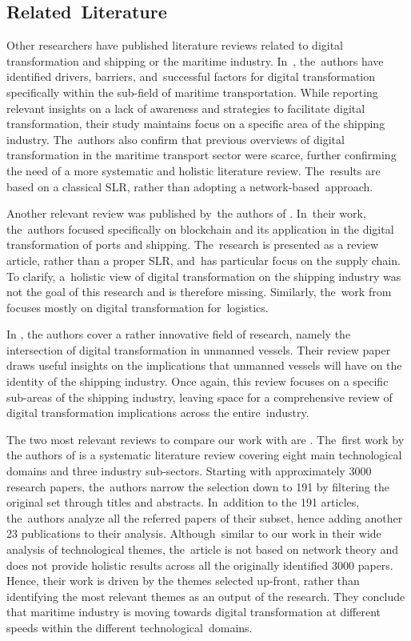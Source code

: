 \documentclass[jmse,review,accept,pdftex,moreauthors]{Definitions/mdpi}
\begin{document}
\subsection{Related~Literature}
Other researchers have published literature reviews related to digital transformation and shipping or the maritime industry. In~\citep{tijan2021digital}, the~authors have identified drivers, barriers, and~successful factors for digital transformation specifically within the sub-field of maritime transportation. While reporting relevant insights on a lack of awareness and strategies to facilitate digital transformation, their study maintains focus on a specific area of the shipping industry. The~authors also confirm that previous overviews of digital transformation in the maritime transport sector were scarce, further confirming the need of a more systematic and holistic literature review. The~results are based on a classical SLR, rather than adopting a network-based~approach.

Another relevant review was published by~the authors of \cite{alahmadi2022comparative}. In~their work, the~authors focused specifically on blockchain and its application in the digital transformation of ports and shipping. The~research is presented as a review article, rather than a proper SLR, and~has particular focus on the supply chain. To clarify, a~holistic view of digital transformation on the shipping industry was not the goal of this research and is therefore missing. Similarly, the~work from \citep{kern2021digital} focuses mostly on digital transformation for~logistics.

In \citep{poulis2020value}, the authors cover a rather innovative field of research, namely the intersection of digital transformation in unmanned vessels. Their review paper draws useful insights on the implications that unmanned vessels will have on the identity of the shipping industry. Once again, this review focuses on a specific sub-areas of the shipping industry, leaving space for a comprehensive review of digital transformation implications across the entire~industry.

The two most relevant reviews to compare our work with are \citep{sanchez2019toward,jovic2022digitalization}. The~first work by the authors of \citep{sanchez2019toward} is a systematic literature review covering eight main technological domains and three industry sub-sectors. Starting with approximately 3000 research papers, the~authors narrow the selection down to 191 by filtering the original set through titles and abstracts. In~addition to the 191 articles, the~authors analyze all the referred papers of their subset, hence adding another 23 publications to their analysis. Although~similar to our work in their wide analysis of technological themes, the~article is not based on network theory and does not provide holistic results across all the originally identified 3000 papers. Hence, their work is driven by the themes selected up-front, rather than identifying the most relevant themes as an output of the research. They conclude that maritime industry is moving towards digital transformation at different speeds within the different technological~domains.
\end{document}
